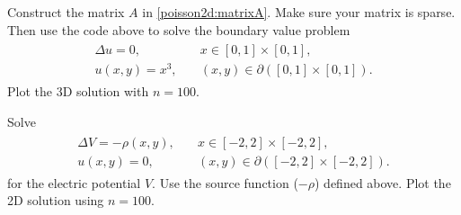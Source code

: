 
%
% 
Construct the matrix $A$ in \eqref{poisson2d:matrixA}. Make sure your matrix is sparse. Then use the code 
above to solve the boundary value problem
\begin{align}
	\begin{split}
	\Delta u = 0, &{}\quad x \in [0,1]\times [0,1],\\
	u(x,y) = x^3, &{}\quad (x,y) \in \partial ([0,1]\times [0,1]).
	\end{split}
	\label{poisson2d:laplace}
\end{align}
Plot the 3D solution with $n=100$.

Solve 
\begin{align}
	\begin{split}
	\Delta V = -\rho(x,y), &{}\quad x \in [-2,2]\times [-2,2],\\
	u(x,y) = 0, &{}\quad (x,y) \in \partial ([-2,2]\times [-2,2]).
	\end{split}
	\label{poisson2d:source}
\end{align}
% 
for the electric potential $V.$
Use the source function ($-\rho$) defined above. %
Plot the 2D solution using $n=100$.
